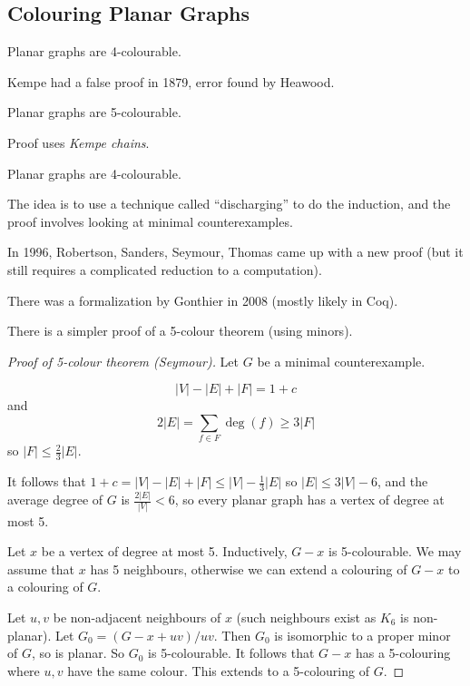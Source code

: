 \documentclass[main.tex]{subfiles}
\begin{document}
\subsection{Colouring Planar Graphs}
\begin{conjecture}[Guthrie 1952]%
  Planar graphs are 4-colourable.
\end{conjecture}
Kempe had a false proof in 1879, error found by Heawood.
\begin{theorem}[Heawood 1922]
  Planar graphs are 5-colourable.
\end{theorem}
Proof uses \textit{Kempe chains}.
\begin{theorem}
  Planar graphs are 4-colourable.
\end{theorem}
The idea is to use a technique called ``discharging'' to do the induction,
and the proof involves looking at minimal counterexamples.

In 1996, Robertson, Sanders, Seymour, Thomas came up with a new proof
(but it still requires a complicated reduction to a computation).

There was a formalization by Gonthier in 2008 (mostly likely in Coq).

There is a simpler proof of a 5-colour theorem (using minors).
\begin{proof}[Proof of 5-colour theorem (Seymour)]
  Let $G$ be a minimal counterexample.
  \begin{fact*}
    \leavevmode\vspace{-0.5em}
    \[
      |V| - |E| + |F| = 1 + c
    \]
    and
    \[
      2|E| = \sum_{f\in F}\deg(f)\geq 3|F|
    \]
    so $|F|\leq\frac 2 3|E|$.
  \end{fact*}
  It follows that $1 + c = |V| - |E| + |F|\leq|V| - \frac 1 3|E|$ so
  $|E|\leq 3|V| - 6$, and the average degree of $G$ is $\frac{2|E|}{|V|} < 6$,
  so every planar graph has a vertex of degree at most 5.

  Let $x$ be a vertex of degree at most 5.
  Inductively, $G - x$ is 5-colourable.
  We may assume that $x$ has 5 neighbours, otherwise we can extend a colouring
  of $G - x$ to a colouring of $G$.

  Let $u,v$ be non-adjacent neighbours of $x$ (such neighbours exist as $K_6$
  is non-planar).
  Let $G_0 = (G - x + uv)/uv$.
  Then $G_0$ is isomorphic to a proper minor of $G$, so is planar.
  So $G_0$ is 5-colourable.
  It follows that $G-x$ has a 5-colouring where $u, v$ have the same colour.
  This extends to a 5-colouring of $G$.
\end{proof}
\end{document}
